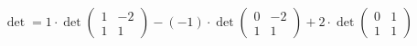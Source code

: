 \documentclass[preview]{standalone}
\begin{document}
\begin{align*}
\det = 1 \cdot \det\begin{pmatrix} 1 & -2 \\ 1 & 1 \end{pmatrix} - (-1) \cdot \det\begin{pmatrix} 0 & -2 \\ 1 & 1 \end{pmatrix} + 2 \cdot \det\begin{pmatrix} 0 & 1 \\ 1 & 1 \end{pmatrix}
\end{align*}
\end{document}
